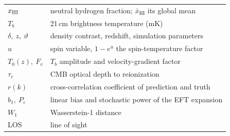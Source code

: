 \begin{table}[H]
\begin{tabular}{@{}ll@{}}
    $x_{\mathrm{HI}}$                    & neutral hydrogen fraction; $\bar x_{\mathrm{HI}}$ its global mean \\
    $T_b$                     & 21\,cm brightness temperature (mK) \\
    $\delta,\ z,\ \vartheta$  & density contrast, redshift, simulation parameters \\
    $u$                       & spin variable, $1-e^{u}$ the spin-temperature factor \\
    $T_0(z),\ F_v$            & $T_b$ amplitude and velocity-gradient factor \\
    $\tau_e$                  & CMB optical depth to reionization \\
    $r(k)$                    & cross-correlation coefficient of prediction and truth \\
    $b_1,\ P_\varepsilon$     & linear bias and stochastic power of the EFT expansion \\
    $W_1$                     & Wasserstein-1 distance \\
    LOS                       & line of sight \\
    \bottomrule
  \end{tabular}
\end{table}
